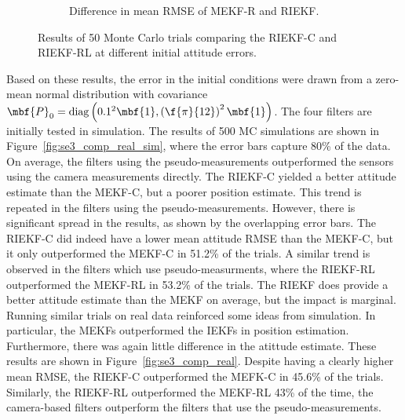 \begin{figure}
\begin{subfigure}[b]{0.5\textwidth}
		\caption{Difference in mean RMSE of MEKF-R and RIEKF.}
	\end{subfigure}
	\caption[Results comparing the RIEKF-C and RIEKF-RL at different initial attitude errors.]{Results of 50 Monte Carlo trials comparing the RIEKF-C and RIEKF-RL at different initial attitude errors.}
	\label{fig:se3_comp_real_att_sim}
\end{figure} 

Based on these results, the error in the initial conditions were drawn from a zero-mean normal distribution with covariance $\mbf{P}_0 = \mathrm{diag}\left(0.1^2 \mbf{1}, \left(\f{\pi}{12}\right)^2\mbf{1}\right)$. The four filters are initially tested in simulation. The results of 500 MC simulations are shown in Figure~\ref{fig:se3_comp_real_sim}, where the error bars capture 80\% of the data. On average, the filters using the pseudo-measurements outperformed the sensors using the camera measurements directly. The RIEKF-C yielded a better attitude estimate than the MEKF-C, but a poorer position estimate.  This trend is repeated in the filters using the pseudo-measurements. However, there is significant spread in the results, as shown by the overlapping error bars. The RIEKF-C did indeed have a lower mean attitude RMSE than the MEKF-C, but it only outperformed the MEKF-C in 51.2\% of the trials. A similar trend is observed in the filters which use pseudo-measurments, where the RIEKF-RL outperformed the MEKF-RL in 53.2\% of the trials. The RIEKF does provide a better attitude estimate than the MEKF on average, but the impact is marginal. Running similar trials on real data reinforced some ideas from simulation. In particular, the MEKFs outperformed the IEKFs in position estimation. Furthermore, there was again little difference in the atittude estimate. These results are shown in Figure~\ref{fig:se3_comp_real}. Despite having a clearly higher mean RMSE, the RIEKF-C outperformed the MEFK-C in 45.6\% of the trials. Similarly, the RIEKF-RL outperformed the MEKF-RL 43\% of the time, the camera-based filters outperform the filters that use the pseudo-measurements.
